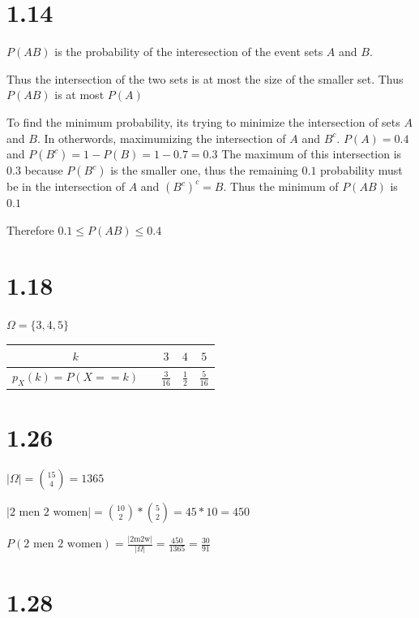 \documentclass[
  letterpaper,
  DIV=11,
  numbers=noendperiod]{scrartcl}
\author{}
\date{}
\begin{document}
\section{1.14}\label{section}

\(P(AB)\) is the probability of the interesection of the event sets
\(A\) and \(B\).

Thus the intersection of the two sets is at most the size of the smaller
set. Thus \(P(AB)\) is at most \(P(A)\)

To find the minimum probability, its trying to minimize the intersection
of sets \(A\) and \(B\). In otherwords, maximumizing the intersection of
\(A\) and \(B^c\). \(P(A)=0.4\) and \(P(B^c)=1-P(B)=1-0.7=0.3\) The
maximum of this intersection is \(0.3\) because \(P(B^c)\) is the
smaller one, thus the remaining \(0.1\) probability must be in the
intersection of \(A\) and \((B^{c})^{c}=B\). Thus the minimum of
\(P(AB)\) is \(0.1\)

Therefore \(0.1 \leq P(AB) \leq 0.4\)

\section{1.18}\label{section-1}

\(\Omega = \{3,4,5\}\)

\begin{longtable}[]{@{}clccc@{}}
\toprule\noalign{}
\(k\) & \textbar{} & \(3\) & \(4\) & \(5\) \\
\midrule\noalign{}
\endhead
\bottomrule\noalign{}
\endlastfoot
\(p_X(k) = P(X == k)\) & \textbar{} & \(\frac3{16}\) & \(\frac12\) &
\(\frac{5}{16}\) \\
\end{longtable}

\section{1.26}\label{section-2}

\(|\Omega | = \binom{15}{4}  =1365\)

\(|\text{2 men 2 women}| = \binom{10}{2} * \binom{5}{2}= 45*10=450\)

\(P(\text{2 men 2 women}) = \frac{|\text{2m2w}|}{|\Omega|} =\frac{450}{1365}=\frac{30}{91}\)

\section{1.28}\label{section-3}
\end{document}

